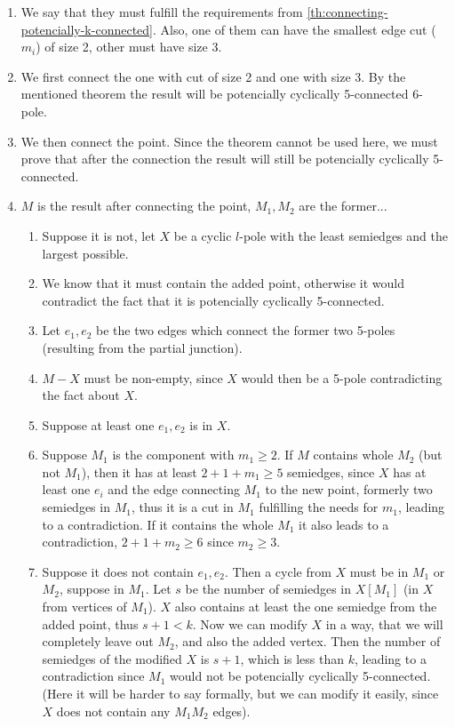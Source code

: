 \documentclass[12pt, twoside]{book}
\begin{document}
\begin{enumerate}
	\item We say that they must fulfill the requirements from \cref{th:connecting-potencially-k-connected}. Also, one of them can have the smallest edge cut ($m_i$) of size 2, other must have size 3.
	\item We first connect the one with cut of size 2 and one with size 3. By the mentioned theorem the result will be potencially cyclically 5-connected 6-pole.
	\item We then connect the point. Since the theorem cannot be used here, we must prove that after the connection the result will still be potencially cyclically 5-connected.
	\item $M$ is the result after connecting the point, $M_1,M_2$ are the former...
	\begin{enumerate}
		\item Suppose it is not, let $X$ be a cyclic $l$-pole with the least semiedges and the largest possible.
		\item We know that it must contain the added point, otherwise it would contradict the fact that it is potencially cyclically 5-connected.
		\item Let $e_1,e_2$ be the two edges which connect the former two 5-poles (resulting from the partial junction).
		\item $M-X$ must be non-empty, since $X$ would then be a 5-pole contradicting the fact about $X$.
		\item Suppose at least one $e_1,e_2$ is in $X$.
		\item Suppose $M_1$ is the component with $m_1\geq 2$. If $M$ contains whole $M_2$ (but not $M_1$), then it has at least $2+1+m_1\geq 5$ semiedges, since $X$ has at least one $e_i$ and the edge connecting $M_1$ to the new point, formerly two semiedges in $M_1$, thus it is a cut in $M_1$ fulfilling the needs for $m_1$, leading to a contradiction. If it contains the whole $M_1$ it also leads to a contradiction, $2+1+m_2\geq 6$ since $m_2\geq 3$. 
		\item Suppose it does not contain $e_1,e_2$. Then a cycle from $X$ must be in $M_1$ or $M_2$, suppose in $M_1$. Let $s$ be the number of semiedges in $X[M_1]$ (in $X$ from vertices of $M_1$). $X$ also contains at least the one semiedge from the added point, thus $s+1<k$. Now we can modify $X$ in a way, that we will completely leave out $M_2$, and also the added vertex. Then the number of semiedges of the modified $X$ is $s+1$, which is less than $k$, leading to a contradiction since $M_1$ would not be potencially cyclically 5-connected. (Here it will be harder to say formally, but we can modify it easily, since $X$ does not contain any $M_1M_2$ edges).

\end{enumerate}
\end{enumerate}
\end{document}
